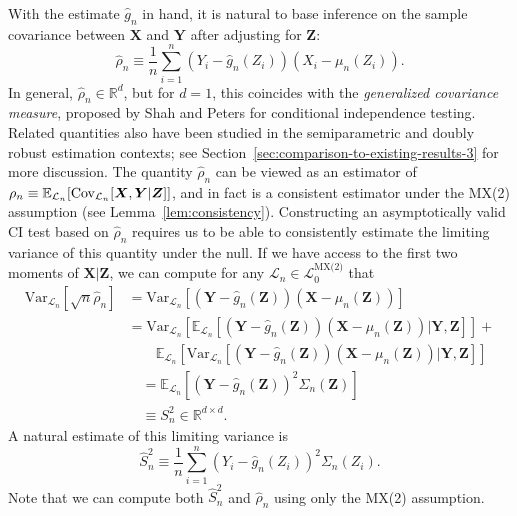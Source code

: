 \documentclass[12pt]{article}
\theoremstyle{definition}
\theoremstyle{remark}
\newcommand{\prx}{\bm X}
\newcommand{\srx}{X}
\newcommand{\prz}{\bm Z}
\newcommand{\srz}{Z}
\newcommand{\pry}{{\bm Y}}
\newcommand{\sry}{Y}
\begin{document}
With the estimate $\widehat g_n$ in hand, it is natural to base inference on the sample covariance between $\prx$ and $\pry$ after adjusting for $\prz$:
\begin{equation}
\widehat \rho_n \equiv \frac1n\sum_{i = 1}^n (\sry_{i} - \widehat g_n(\srz_{i}))(\srx_{i} - \mu_n(\srz_i)).
\label{rho-hat}
\end{equation}
In general, $\widehat \rho_n \in \mathbb R^d$, but for $d = 1$, this coincides with the \textit{generalized covariance measure}, proposed by Shah and Peters \cite{Shah2018} for conditional independence testing. Related quantities also have been studied in the semiparametric \cite{Robinson1988, Robins1992} and doubly robust \cite{Robins2001, VanderLaan2003, Chernozhukov2018} estimation contexts; see Section~\ref{sec:comparison-to-existing-results-3} for more discussion. The quantity $\widehat \rho_n$ can be viewed as an estimator of $\rho_n \equiv \mathbb E_{\mathcal L_n}[\textnormal{Cov}_{\mathcal L_n}[\prx,\pry|\prz]]$, and in fact is a consistent estimator under the MX(2) assumption (see Lemma~\ref{lem:consistency}). Constructing an asymptotically valid CI test based on $\widehat \rho_n$ requires us to be able to consistently estimate the limiting variance of this quantity under the null. If we have access to the first two moments of $\prx|\prz$, we can compute for any $\mathcal L_n \in \mathscr L_0^{\text{MX(2)}}$ that
\begin{equation}
\begin{split}
\text{Var}_{\mathcal L_n}[\sqrt{n}\widehat \rho_n] &=\text{Var}_{\mathcal L_n}[(\pry - \widehat g_n(\prz))(\prx - \mu_n(\prz))] \\
&=\text{Var}_{\mathcal L_n}\left[\mathbb E_{\mathcal L_n}[(\pry - \widehat g_n(\prz))(\prx - \mu_n(\prz))|\pry,\prz]\right] + \\
&\quad \quad \mathbb E_{\mathcal L_n}\left[\text{Var}_{\mathcal L_n}[(\pry - \widehat g_n(\prz))(\prx - \mu_n(\prz))|\pry,\prz]\right] \\
&\quad = \mathbb E_{\mathcal L_n}\left[(\pry - \widehat g_n(\prz))^2 \Sigma_n(\prz)\right] \\
&\quad\equiv S^2_{n} \in \mathbb R^{d \times d}.
\label{variance-calculation}
\end{split}
\end{equation}
A natural estimate of this limiting variance is
\begin{equation}
\widehat S_n^2 \equiv \frac{1}{n}\sum_{i = 1}^n (\sry_{i} - \widehat g_n(\srz_{i}))^2\Sigma_n(\srz_i).
\end{equation}
Note that we can compute both $\widehat S_n^2$ and $\widehat \rho_n$ using only the MX(2) assumption. 
\end{document}
